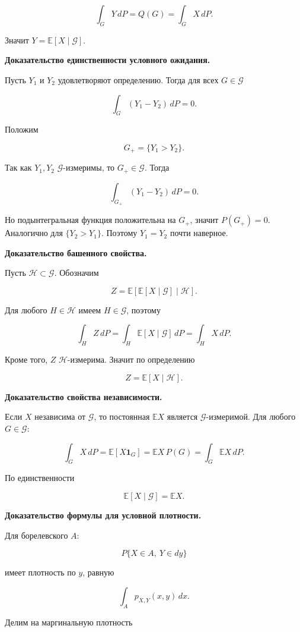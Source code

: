 \documentclass[
  11pt,
  a4paper,
]{article}
\begin{document}
\[
\int_GY\,dP=Q(G)=\int_GX\,dP.
\]

Значит \(Y=\mathbb E[X\mid\mathcal G]\).

\textbf{Доказательство единственности условного ожидания.}

Пусть \(Y_1\) и \(Y_2\) удовлетворяют определению. Тогда для всех
\(G\in\mathcal G\)

\[
\int_G(Y_1-Y_2)\,dP=0.
\]

Положим

\[
G_+=\{Y_1>Y_2\}.
\]

Так как \(Y_1,Y_2\) \(\mathcal G\)-измеримы, то \(G_+\in\mathcal G\).
Тогда

\[
\int_{G_+}(Y_1-Y_2)\,dP=0.
\]

Но подынтегральная функция положительна на \(G_+\), значит \(P(G_+)=0\).
Аналогично для \(\{Y_2>Y_1\}\). Поэтому \(Y_1=Y_2\) почти наверное.

\textbf{Доказательство башенного свойства.}

Пусть \(\mathcal H\subset\mathcal G\). Обозначим

\[
Z=\mathbb E[\mathbb E[X\mid\mathcal G]\mid\mathcal H].
\]

Для любого \(H\in\mathcal H\) имеем \(H\in\mathcal G\), поэтому

\[
\int_H Z\,dP
=
\int_H \mathbb E[X\mid\mathcal G]\,dP
=
\int_H X\,dP.
\]

Кроме того, \(Z\) \(\mathcal H\)-измерима. Значит по определению

\[
Z=\mathbb E[X\mid\mathcal H].
\]

\textbf{Доказательство свойства независимости.}

Если \(X\) независима от \(\mathcal G\), то постоянная \(\mathbb EX\)
является \(\mathcal G\)-измеримой. Для любого \(G\in\mathcal G\):

\[
\int_G X\,dP
=
\mathbb E[X\mathbf 1_G]
=
\mathbb EX\,P(G)
=
\int_G \mathbb EX\,dP.
\]

По единственности

\[
\mathbb E[X\mid\mathcal G]=\mathbb EX.
\]

\textbf{Доказательство формулы для условной плотности.}

Для борелевского \(A\):

\[
P\{X\in A,\ Y\in dy\}
\]

имеет плотность по \(y\), равную

\[
\int_A p_{X,Y}(x,y)\,dx.
\]

Делим на маргинальную плотность
\end{document}

